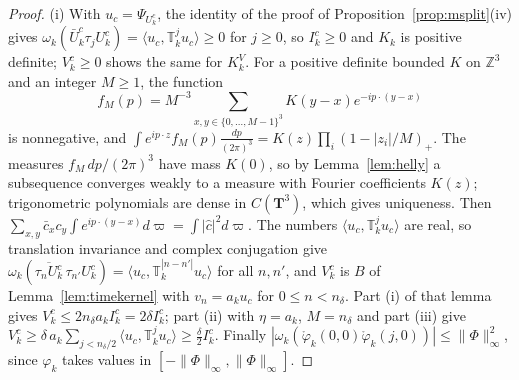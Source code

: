 \documentclass[aps,prd,twocolumn,superscriptaddress,nofootinbib,longbibliography,floatfix,amsmath,amssymb,10pt]{revtex4-2}
\theoremstyle{definition}
\theoremstyle{remark}
\newcommand{\Z}{\mathbb{Z}}
\newcommand{\ip}[2]{\langle #1,#2\rangle}
\begin{document}
\begin{proof}
(i) With $u_c=\Psi_{U^c_k}$, the identity of the proof of
Proposition~\ref{prop:msplit}(iv) gives $\omega_k(\bar U^c_k\tau_jU^c_k)=
\ip{u_c}{\mathbb T_k^ju_c}\ge0$ for $j\ge0$, so $I^c_k\ge0$ and $K_k$ is
positive definite; $V^c_k\ge0$ shows the same for $K^V_k$. For a positive
definite bounded $K$ on $\Z^3$ and an integer $M\ge1$, the function
\[
f_M(p)=M^{-3}\!\!\sum_{x,y\in\{0,\dots,M-1\}^3}\!\!K(y-x)e^{-ip\cdot(y-x)}
\]
is nonnegative, and $\int e^{ip\cdot z}f_M(p)\frac{dp}{(2\pi)^3}=K(z)
\prod_i(1-|z_i|/M)_+$. The measures $f_M\,dp/(2\pi)^3$ have mass $K(0)$, so
by Lemma~\ref{lem:helly} a subsequence converges weakly to a measure with
Fourier coefficients $K(z)$; trigonometric polynomials are dense in
$C(\mathbf T^3)$, which gives uniqueness. Then $\sum_{x,y}\bar c_xc_y
\int e^{ip\cdot(y-x)}d\varpi=\int|\hat c|^2d\varpi$. The numbers $\ip{u_c}{\mathbb
T_k^ju_c}$ are real, so translation invariance and complex conjugation
give
$\omega_k(\overline{\tau_nU^c_k}\,\tau_{n'}U^c_k)=\ip{u_c}{\mathbb
T_k^{|n-n'|}u_c}$ for all $n,n'$, and $V^c_k$ is $B$ of
Lemma~\ref{lem:timekernel} with $v_n=a_ku_c$ for $0\le n<n_\delta$. Part (i)
of that lemma gives $V^c_k\le2n_\delta a_kI^c_k=2\delta I^c_k$; part (ii)
with $\eta=a_k$, $M=n_\delta$ and part (iii) give $V^c_k\ge\delta\,a_k
\sum_{j<n_\delta/2}\ip{u_c}{\mathbb T_k^ju_c}\ge\frac\delta2I^c_k$. Finally
$|\omega_k(\mathring\varphi_k(0,0)\mathring\varphi_k(j,0))|\le\|\Phi\|_\infty^2$, since
$\varphi_k$ takes values in $[-\|\Phi\|_\infty,\|\Phi\|_\infty]$.


\end{proof}
\end{document}
